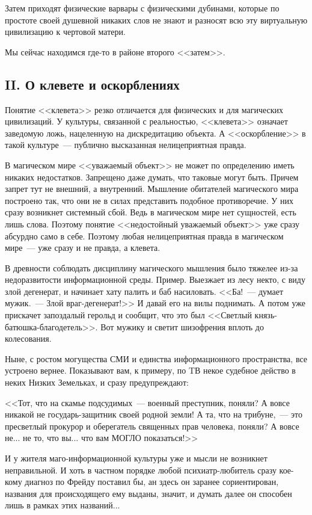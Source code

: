 \documentclass{scrbook}
\newcommand{\flqq}{<<}
\newcommand{\frqq}{>>}
\newcommand{\mdash}{~--- }
\newcommand{\commamdash}{~--- } %
\newcommand{\essaysection}[1]{\subsection*{#1}\nopagebreak}
\begin{document}
Затем приходят физические варвары с физическими дубинами, которые по простоте своей душевной никаких слов не знают и разносят всю эту виртуальную цивилизацию к чертовой матери.

Мы сейчас находимся где-то в районе второго {\flqq}затем{\frqq}.

\essaysection{II. О клевете и оскорблениях}

Понятие {\flqq}клевета{\frqq} резко отличается для физических и для магических цивилизаций. У культуры, связанной с реальностью, {\flqq}клевета{\frqq} означает заведомую ложь, нацеленную на дискредитацию объекта. А {\flqq}оскорбление{\frqq} в такой культуре{\mdash}публично высказанная нелицеприятная правда.

В магическом мире {\flqq}уважаемый объект{\frqq} не может по определению иметь никаких недостатков. Запрещено даже думать, что таковые могут быть. Причем запрет тут не внешний, а внутренний. Мышление обитателей магического мира построено так, что они не в силах представить подобное противоречие. У них сразу возникнет системный сбой. Ведь в магическом мире нет сущностей, есть лишь слова. Поэтому понятие {\flqq}недостойный уважаемый объект{\frqq} уже сразу абсурдно само в себе. Поэтому любая нелицеприятная правда в магическом мире{\mdash}уже сразу и не правда, а клевета.

В древности соблюдать дисциплину магического мышления было тяжелее из-за недоразвитости информационной среды. Пример. Выезжает из лесу некто, с виду злой дегенерат, и начинает хату палить и баб насиловать. {\flqq}Ба!{\mdash}думает мужик.{\mdash} Злой враг-дегенерат!{\frqq} И давай его на вилы поднимать. А потом уже прискачет запоздалый герольд и сообщит, что это был {\flqq}Светлый князь-батюшка-благодетель{\frqq}. Вот мужику и светит шизофрения вплоть до колесования.

Ныне, с ростом могущества СМИ и единства информационного пространства, все устроено вернее. Показывают вам, к примеру, по TВ некое судебное действо в неких Низких Земельках, и сразу предупреждают:

{\flqq}Тот, что на скамье подсудимых{\mdash}военный преступник, поняли? А вовсе никакой не государь-защитник своей родной земли! А та, что на трибуне,{\commamdash} это пресветлый прокурор и оберегатель священных прав человека, поняли? А вовсе не... не то, что вы... что вам МОГЛО показаться!{\frqq}

И у жителя маго-информационной культуры уже и мысли не возникнет неправильной. И хоть в частном порядке любой психиатр-любитель сразу кое-кому диагноз по Фрейду поставил бы, ан здесь он заранее сориентирован, названия для происходящего ему выданы, значит, и думать далее он способен лишь в рамках этих названий...
\end{document}
